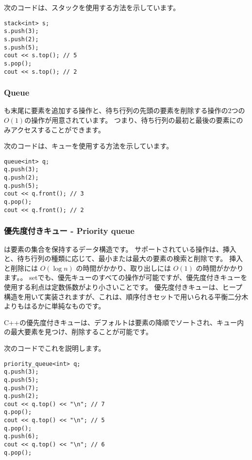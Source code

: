 次のコードは、スタックを使用する方法を示しています。

\begin{lstlisting}
stack<int> s;
s.push(3);
s.push(2);
s.push(5);
cout << s.top(); // 5
s.pop();
cout << s.top(); // 2
\end{lstlisting}
\subsubsection{Queue}


 も末尾に要素を追加する操作と、待ち行列の先頭の要素を削除する操作の2つの$O(1)$の操作が用意されています。
つまり、待ち行列の最初と最後の要素にのみアクセスすることができます。

次のコードは、キューを使用する方法を示しています。

\begin{lstlisting}
queue<int> q;
q.push(3);
q.push(2);
q.push(5);
cout << q.front(); // 3
q.pop();
cout << q.front(); // 2
\end{lstlisting}

\subsubsection{優先度付きキュー - Priority queue}


は要素の集合を保持するデータ構造です。
サポートされている操作は、挿入と、待ち行列の種類に応じて、最小または最大の要素の検索と削除です。
挿入と削除には $O(\log n)$ の時間がかかり、取り出しには $O(1)$ の時間がかかります。。
setでも、優先キューのすべての操作が可能ですが、優先度付きキューを使用する利点は定数係数がより小さいことです。
優先度付きキューは、ヒープ構造を用いて実装されますが、これは、順序付きセットで用いられる平衡二分木よりもはるかに単純なものです。


\begin{samepage}
C++の優先度付きキューは、デフォルトは要素の降順でソートされ、キュー内の最大要素を見つけ、削除することが可能です。

次のコードでこれを説明します。

\begin{lstlisting}
priority_queue<int> q;
q.push(3);
q.push(5);
q.push(7);
q.push(2);
cout << q.top() << "\n"; // 7
q.pop();
cout << q.top() << "\n"; // 5
q.pop();
q.push(6);
cout << q.top() << "\n"; // 6
q.pop();
\end{lstlisting}
\end{samepage}

